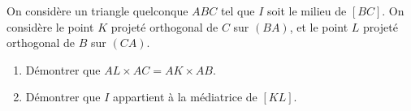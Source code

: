 
On considère un triangle quelconque $ABC$ tel que $I$ soit le milieu de $[BC]$. On considère le point $K$ projeté orthogonal de $C$ sur $(BA)$, et le point $L$ projeté orthogonal de $B$ sur $(CA)$.

\begin{enumerate}
\item Démontrer que $AL \times AC = AK \times AB$.
\item Démontrer que $I$ appartient  à la médiatrice de $[KL]$. 
\end{enumerate}
